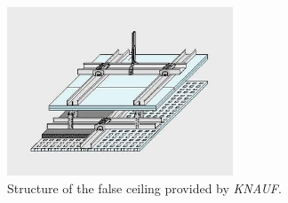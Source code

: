 \begin{figure}[H]
	\centering
	\includegraphics[clip, trim=0cm 0cm 0cm 0cm, width=0.6\textwidth]{./images/cover/falseceiling}
	\caption{Structure of the false ceiling provided by \textit{KNAUF}.}
	\label{falseceiling}
\end{figure}
